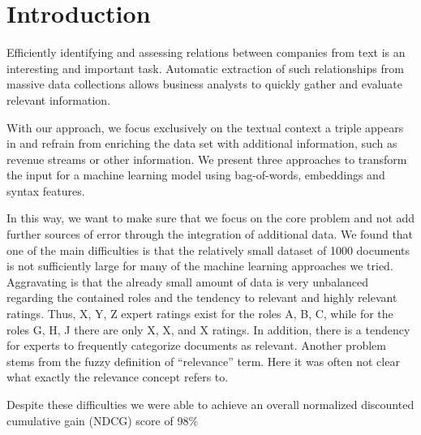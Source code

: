 \section{Introduction}



Efficiently identifying and assessing relations between companies from text is an interesting and important task\cite{entityextraction}.
Automatic extraction of such relationships from massive data collections allows business analysts to quickly gather and evaluate relevant information.


With our approach, we focus exclusively on the textual context a triple appears in and refrain from enriching the data set with additional information, such as revenue streams or other information.
We present three approaches to transform the input for a machine learning model using bag-of-words, embeddings and syntax features.





In this way, we want to make sure that we focus on the core problem and not add further sources of error through the integration of additional data.
We found that one of the main difficulties is that the relatively small dataset of 1000 documents is not sufficiently large for many of the machine learning approaches we tried. 
Aggravating is that the already small amount of data is very unbalanced regarding the contained roles and the tendency to relevant and highly relevant ratings.
Thus, X, Y, Z expert ratings exist for the roles A, B, C, while for the roles G, H, J there are only X, X, and X ratings.  
In addition, there is a tendency for experts to frequently categorize documents as relevant.
Another problem stems from the fuzzy definition of ``relevance'' term.
Here it was often not clear what exactly the relevance concept refers to.

Despite these difficulties we were able to achieve an overall normalized discounted cumulative gain (NDCG) score of 98\%

